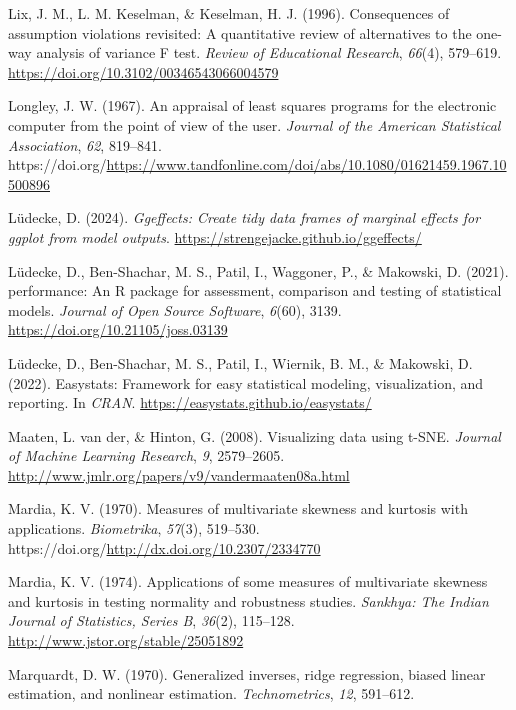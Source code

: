\documentclass[
  letterpaper,
  10pt,
  krantz2]{krantz}
\newlength{\cslhangindent}
\newenvironment{CSLReferences}[2] %
 {\begin{list}{}{%
  \setlength{\itemindent}{0pt}
  \setlength{\leftmargin}{0pt}
  \setlength{\parsep}{0pt}
  \ifodd #1
   \setlength{\leftmargin}{\cslhangindent}
   \setlength{\itemindent}{-1\cslhangindent}
  \fi
  \setlength{\itemsep}{#2\baselineskip}}}
 {\end{list}}
\begin{document}
\begin{CSLReferences}{1}{0}
Lix, J. M., L. M. Keselman, \& Keselman, H. J. (1996). Consequences of
assumption violations revisited: A quantitative review of alternatives
to the one-way analysis of variance {F} test. \emph{Review of
Educational Research}, \emph{66}(4), 579--619.
\url{https://doi.org/10.3102/00346543066004579}

Longley, J. W. (1967). An appraisal of least squares programs for the
electronic computer from the point of view of the user. \emph{Journal of
the American Statistical Association}, \emph{62}, 819--841.
https://doi.org/\url{https://www.tandfonline.com/doi/abs/10.1080/01621459.1967.10500896}

Lüdecke, D. (2024). \emph{Ggeffects: Create tidy data frames of marginal
effects for ggplot from model outputs}.
\url{https://strengejacke.github.io/ggeffects/}

Lüdecke, D., Ben-Shachar, M. S., Patil, I., Waggoner, P., \& Makowski,
D. (2021). {performance}: An {R} package for assessment, comparison and
testing of statistical models. \emph{Journal of Open Source Software},
\emph{6}(60), 3139. \url{https://doi.org/10.21105/joss.03139}

Lüdecke, D., Ben-Shachar, M. S., Patil, I., Wiernik, B. M., \& Makowski,
D. (2022). Easystats: Framework for easy statistical modeling,
visualization, and reporting. In \emph{CRAN}.
\url{https://easystats.github.io/easystats/}

Maaten, L. van der, \& Hinton, G. (2008). Visualizing data using
{t-SNE}. \emph{Journal of Machine Learning Research}, \emph{9},
2579--2605. \url{http://www.jmlr.org/papers/v9/vandermaaten08a.html}

Mardia, K. V. (1970). Measures of multivariate skewness and kurtosis
with applications. \emph{Biometrika}, \emph{57}(3), 519--530.
https://doi.org/\url{http://dx.doi.org/10.2307/2334770}

Mardia, K. V. (1974). Applications of some measures of multivariate
skewness and kurtosis in testing normality and robustness studies.
\emph{Sankhya: The Indian Journal of Statistics, Series B},
\emph{36}(2), 115--128. \url{http://www.jstor.org/stable/25051892}

Marquardt, D. W. (1970). Generalized inverses, ridge regression, biased
linear estimation, and nonlinear estimation. \emph{Technometrics},
\emph{12}, 591--612.


\end{CSLReferences}
\end{document}
